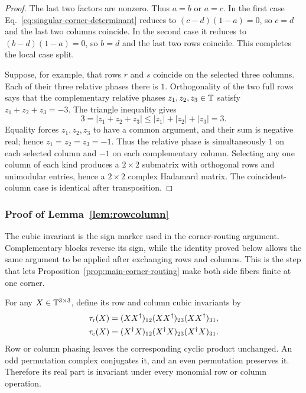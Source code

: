 \begin{proof}
The last two factors are nonzero. Thus $a=b$ or $a=c$. In the first case Eq.~\eqref{eq:singular-corner-determinant} reduces to $(c-d)(1-a)=0$, so $c=d$ and the last two columns coincide. In the second case it reduces to $(b-d)(1-a)=0$, so $b=d$ and the last two rows coincide. This completes the local case split.

Suppose, for example, that rows $r$ and $s$ coincide on the selected three columns. Each of their three relative phases there is $1$. Orthogonality of the two full rows says that the complementary relative phases $z_1,z_2,z_3\in\mathbb T$ satisfy $z_1+z_2+z_3=-3$. The triangle inequality gives
\begin{equation}
3=|z_1+z_2+z_3|\leq |z_1|+|z_2|+|z_3|=3.
\end{equation}
Equality forces $z_1,z_2,z_3$ to have a common argument, and their sum is negative real; hence $z_1=z_2=z_3=-1$. Thus the relative phase is simultaneously $1$ on each selected column and $-1$ on each complementary column. Selecting any one column of each kind produces a $2\times2$ submatrix with orthogonal rows and unimodular entries, hence a $2\times2$ complex Hadamard matrix. The coincident-column case is identical after transposition.
\end{proof}

\subsubsection{{Proof of Lemma~\ref{lem:rowcolumn}}}
\label{sec:invariant}

{The cubic invariant is the sign marker used in the corner-routing argument. Complementary blocks reverse its sign, while the identity proved below allows the same argument to be applied after exchanging rows and columns. This is the step that lets Proposition~\ref{prop:main-corner-routing} make both side fibers finite at one corner.}

For any $X\in\mathbb T^{3\times3}$, define its row and column cubic invariants by
\begin{equation}
\begin{aligned}
\tau_{\rm r}(X)&=(XX^{\dagger})_{12}(XX^{\dagger})_{23}
(XX^{\dagger})_{31},\\
\tau_{\rm c}(X)&=(X^{\dagger}X)_{12}(X^{\dagger}X)_{23}
(X^{\dagger}X)_{31}.
\end{aligned}
\label{eq:cubicinvariants}
\end{equation}
Row or column phasing leaves the corresponding cyclic product unchanged. An odd permutation complex conjugates it, and an even permutation preserves it. Therefore its real part is invariant under every monomial row or column operation.

